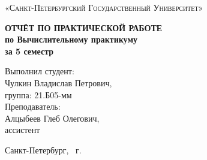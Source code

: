 \documentclass[14pt,a4paper,report]{ncc}
\begin{document}
\renewcommand{\chaptername}{Часть}
\def\contentsname{Содержание}

\begin{titlepage}
\begin{center}
\textsc{«Санкт-Петербургский Государственный Университет»}

\vfill

\textbf{ОТЧЁТ ПО ПРАКТИЧЕСКОЙ РАБОТЕ\\[3mm]
по Вычислительному практикуму\\[3mm]
за 5 семестр\\[110mm]
}
\end{center}

\hfill
\begin{minipage}{.4\textwidth}
Выполнил студент:\\[1mm] 
Чулкин Владислав Петрович,\\
группа: 21.Б05-мм\\[3mm]
Преподаватель:\\[1mm]
Алцыбеев Глеб Олегович,\\[1mm] ассистент

\end{minipage}%
\vfill
\begin{center}
 Санкт-Петербург, \theyear\ г.
\end{center}
\end{titlepage}

\tableofcontents
\newpage









\end{document}

